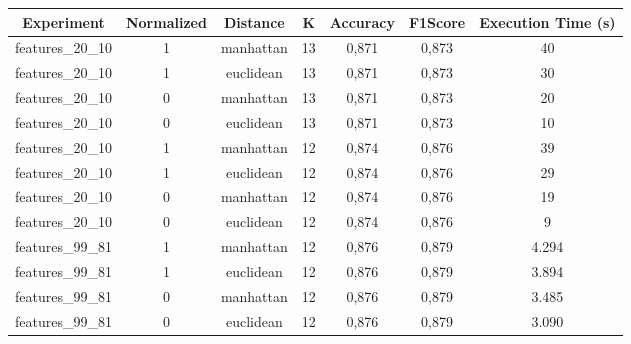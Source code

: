 \documentclass[12pt]{article}
\begin{document}
\begin{table}[!htb]
  \centering
  \begin{tabular}{|c|c|c|c|c|c|c|}
  \hline
  \textbf{Experiment} & \textbf{Normalized} & \textbf{Distance} & \textbf{K} & \textbf{Accuracy} & \textbf{F1Score} & \textbf{Execution Time (s)} \\ \hline
  features\_20\_10    & 1                   & manhattan         & 13         & 0,871             & 0,873            & 40                          \\ \hline
  features\_20\_10    & 1                   & euclidean         & 13         & 0,871             & 0,873            & 30                          \\ \hline
  features\_20\_10    & 0                   & manhattan         & 13         & 0,871             & 0,873            & 20                          \\ \hline
  features\_20\_10    & 0                   & euclidean         & 13         & 0,871             & 0,873            & 10                          \\ \hline
  features\_20\_10    & 1                   & manhattan         & 12         & 0,874             & 0,876            & 39                          \\ \hline
  features\_20\_10    & 1                   & euclidean         & 12         & 0,874             & 0,876            & 29                          \\ \hline
  features\_20\_10    & 0                   & manhattan         & 12         & 0,874             & 0,876            & 19                          \\ \hline
  features\_20\_10    & 0                   & euclidean         & 12         & 0,874             & 0,876            & 9                           \\ \hline
  features\_99\_81    & 1                   & manhattan         & 12         & 0,876             & 0,879            & 4.294                       \\ \hline
  features\_99\_81    & 1                   & euclidean         & 12         & 0,876             & 0,879            & 3.894                       \\ \hline
  features\_99\_81    & 0                   & manhattan         & 12         & 0,876             & 0,879            & 3.485                       \\ \hline
  features\_99\_81    & 0                   & euclidean         & 12         & 0,876             & 0,879            & 3.090                       \\ \hline

\end{tabular}
\end{table}
\end{document}
